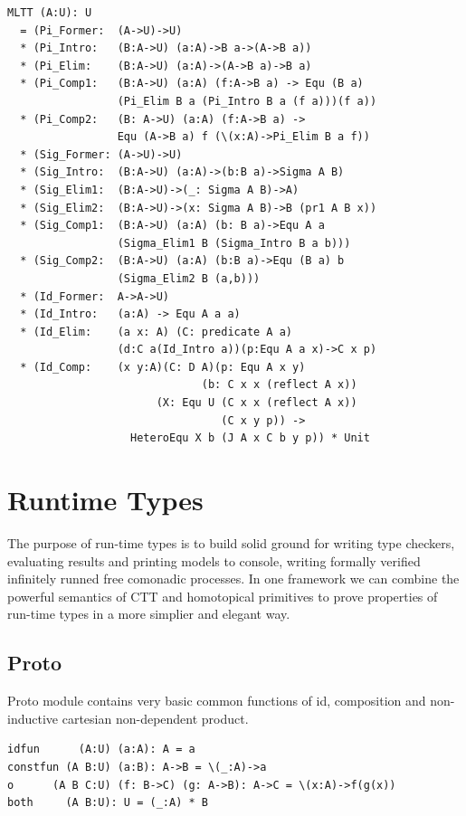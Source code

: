 \documentclass{article}
\begin{document}
\begin{lstlisting}[mathescape=true]
MLTT (A:U): U
  = (Pi_Former:  (A->U)->U)
  * (Pi_Intro:   (B:A->U) (a:A)->B a->(A->B a))
  * (Pi_Elim:    (B:A->U) (a:A)->(A->B a)->B a)
  * (Pi_Comp1:   (B:A->U) (a:A) (f:A->B a) -> Equ (B a)
                 (Pi_Elim B a (Pi_Intro B a (f a)))(f a))
  * (Pi_Comp2:   (B: A->U) (a:A) (f:A->B a) ->
                 Equ (A->B a) f (\(x:A)->Pi_Elim B a f))
  * (Sig_Former: (A->U)->U)
  * (Sig_Intro:  (B:A->U) (a:A)->(b:B a)->Sigma A B)
  * (Sig_Elim1:  (B:A->U)->(_: Sigma A B)->A)
  * (Sig_Elim2:  (B:A->U)->(x: Sigma A B)->B (pr1 A B x))
  * (Sig_Comp1:  (B:A->U) (a:A) (b: B a)->Equ A a
                 (Sigma_Elim1 B (Sigma_Intro B a b)))
  * (Sig_Comp2:  (B:A->U) (a:A) (b:B a)->Equ (B a) b
                 (Sigma_Elim2 B (a,b)))
  * (Id_Former:  A->A->U)
  * (Id_Intro:   (a:A) -> Equ A a a)
  * (Id_Elim:    (a x: A) (C: predicate A a)
                 (d:C a(Id_Intro a))(p:Equ A a x)->C x p)
  * (Id_Comp:    (x y:A)(C: D A)(p: Equ A x y)
                              (b: C x x (reflect A x))
                       (X: Equ U (C x x (reflect A x))
                                 (C x y p)) ->
                   HeteroEqu X b (J A x C b y p)) * Unit
\end{lstlisting}

\newpage
\section{Runtime Types}

The purpose of run-time types is to build solid ground for
writing type checkers, evaluating results and printing models to console,
writing formally verified infinitely runned free comonadic processes.
In one framework we can combine the powerful semantics of CTT and
homotopical primitives to prove properties of run-time types in
a more simplier and elegant way.

\subsection{Proto}

Proto module contains very basic common functions of id, composition and
non-inductive cartesian non-dependent product.

\begin{lstlisting}[mathescape=true]
idfun      (A:U) (a:A): A = a
constfun (A B:U) (a:B): A->B = \(_:A)->a
o      (A B C:U) (f: B->C) (g: A->B): A->C = \(x:A)->f(g(x))
both     (A B:U): U = (_:A) * B
\end{lstlisting}
\end{document}
